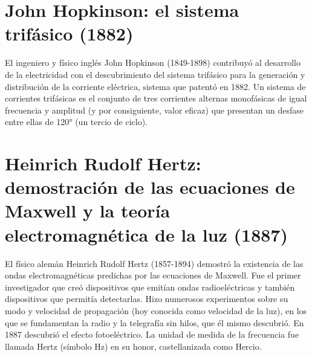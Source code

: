 \documentclass{article}
\begin{document}
\section{John Hopkinson: el sistema trifásico (1882)}

El ingeniero y físico inglés John Hopkinson (1849-1898) contribuyó al desarrollo de la electricidad con el descubrimiento del sistema trifásico para la generación y distribución de la corriente eléctrica, sistema que patentó en 1882. Un sistema de corrientes trifásicas es el conjunto de tres corrientes alternas monofásicas de igual frecuencia y amplitud (y por consiguiente, valor eficaz) que presentan un desfase entre ellas de 120° (un tercio de ciclo). \citep{HDE}\\


\section{Heinrich Rudolf Hertz: demostración de las ecuaciones de Maxwell y la teoría electromagnética de la luz (1887)}

El físico alemán Heinrich Rudolf Hertz (1857-1894) demostró la existencia de las ondas electromagnéticas predichas por las ecuaciones de Maxwell. Fue el primer investigador que creó dispositivos que emitían ondas radioeléctricas y también dispositivos que permitía detectarlas. Hizo numerosos experimentos sobre su modo y velocidad de propagación (hoy conocida como velocidad de la luz), en los que se fundamentan la radio y la telegrafía sin hilos, que él mismo descubrió. En 1887 descubrió el efecto fotoeléctrico. La unidad de medida de la frecuencia fue llamada Hertz (símbolo Hz) en su honor, castellanizada como Hercio.\citep{HDE}\\
\end{document}
